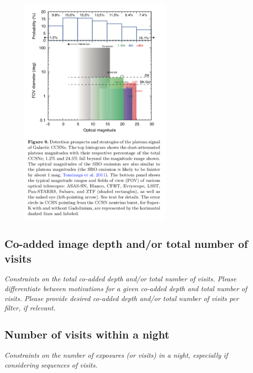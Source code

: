 \documentclass[11pt]{article}
\begin{document}
\begin{figure}
  \begin{center}
    \includegraphics[width=3.0in]{multimessenger-comparison}
    \caption{}
    \label{fig:multimessenger-comparison}
  \end{center}
\end{figure}



\subsection{Co-added image depth and/or total number of visits}
\begin{footnotesize}{\it  Constraints on the total co-added depth and/or total number of visits.
Please differentiate between motivations for a given co-added depth and total number of visits. 
Please provide desired co-added depth and/or total number of visits per filter, if relevant.}
\end{footnotesize}

\subsection{Number of visits within a night}
\begin{footnotesize}{\it Constraints on the number of exposures (or visits) in a night, especially if considering sequences of visits.  }
\end{footnotesize}
\end{document}
